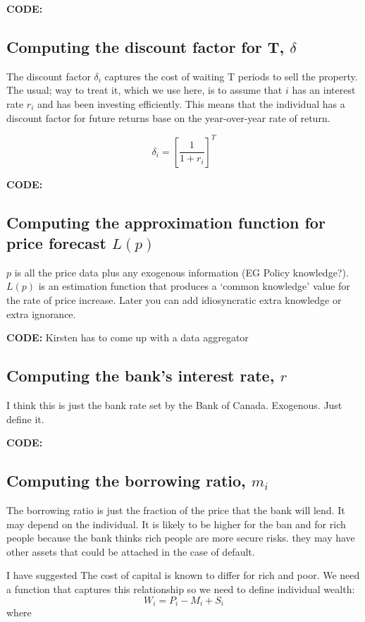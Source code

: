 \textbf{CODE:}  

\subsection{Computing the discount factor for T, $\delta$}
The discount factor $\delta_i$ captures the cost of waiting T periods to sell the property. The usual; way to treat it, which we use here, is to assume that $i$ has an interest rate $r_i$ and has been investing efficiently. This means that  the individual has a discount factor for future returns base on the year-over-year rate of return. 

\[\delta_i=\left[\frac{1}{1+r_i}\right]^T\]

\textbf{CODE:}  
\subsection{Computing the approximation function for price forecast $L(p)$}
$p$ is all the price data plus any exogenous information (EG Policy knowledge?). $L(p)$ is an estimation function that produces a `common knowledge' value for the rate of price increase. Later you can add idiosyncratic extra knowledge or extra ignorance.

\textbf{CODE:}  Kirsten has to come up with a data aggregator 



\subsection{Computing the bank's interest rate, $r$}

I think this is just the bank rate set by the Bank of Canada. Exogenous. Just define it.

\textbf{CODE:}  

\subsection{Computing the borrowing ratio, $m_i$}
The borrowing ratio is just the fraction of the price that the bank will lend. It may depend on the individual. It is likely to be higher for the ban and for rich people because the bank thinks rich people are more secure risks. they may have other assets that could be attached in the case of default.


I have suggested The cost of capital is known to differ for rich and poor. We need a function that captures this relationship so we need to define individual wealth:
\[W_i= P_i -M_i  +S_i\]
where 

